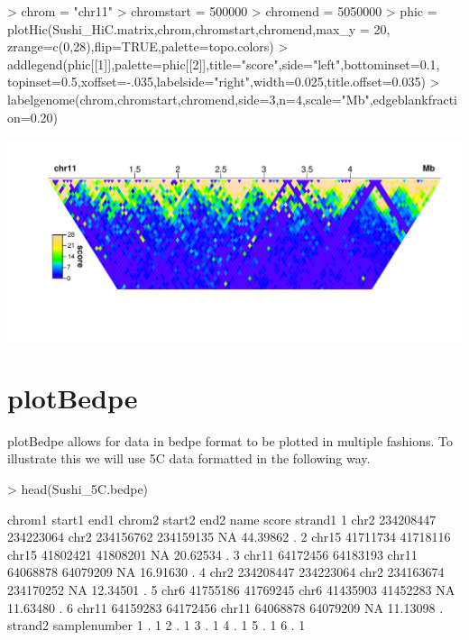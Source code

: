 \documentclass{article}
\begin{document}
\begin{center}

\begin{Schunk}
\begin{Sinput}
> chrom            = "chr11"
> chromstart       = 500000
> chromend         = 5050000
> phic = plotHic(Sushi_HiC.matrix,chrom,chromstart,chromend,max_y = 20,
                zrange=c(0,28),flip=TRUE,palette=topo.colors)
> addlegend(phic[[1]],palette=phic[[2]],title="score",side="left",bottominset=0.1,
           topinset=0.5,xoffset=-.035,labelside="right",width=0.025,title.offset=0.035)
> labelgenome(chrom,chromstart,chromend,side=3,n=4,scale="Mb",edgeblankfraction=0.20)
\end{Sinput}
\end{Schunk}
\includegraphics{Sushi-020}
\end{center}



\section{plotBedpe}

plotBedpe allows for data in bedpe format to be plotted in multiple fashions.  To illustrate this we will use 5C data formatted in the following way.

\begin{Schunk}
\begin{Sinput}
>   head(Sushi_5C.bedpe)
\end{Sinput}
\begin{Soutput}
  chrom1    start1      end1 chrom2    start2      end2 name    score strand1
1   chr2 234208447 234223064   chr2 234156762 234159135   NA 44.39862       .
2  chr15  41711734  41718116  chr15  41802421  41808201   NA 20.62534       .
3  chr11  64172456  64183193  chr11  64068878  64079209   NA 16.91630       .
4   chr2 234208447 234223064   chr2 234163674 234170252   NA 12.34501       .
5   chr6  41755186  41769245   chr6  41435903  41452283   NA 11.63480       .
6  chr11  64159283  64172456  chr11  64068878  64079209   NA 11.13098       .
  strand2 samplenumber
1       .            1
2       .            1
3       .            1
4       .            1
5       .            1
6       .            1
\end{Soutput}
\end{Schunk}
\end{document}
